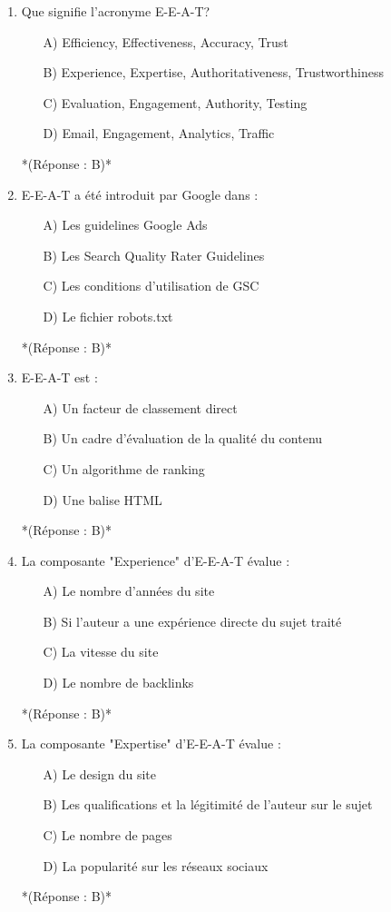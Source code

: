 \documentclass[12pt,a4paper,twoside]{report}
\begin{document}
\begin{enumerate}
\item Que signifie l'acronyme E-E-A-T?
\begin{itemize}
\item[A)] Efficiency, Effectiveness, Accuracy, Trust
\item[B)] Experience, Expertise, Authoritativeness, Trustworthiness
\item[C)] Evaluation, Engagement, Authority, Testing
\item[D)] Email, Engagement, Analytics, Traffic
\end{itemize}
*(Réponse : B)*

\item E-E-A-T a été introduit par Google dans :
\begin{itemize}
\item[A)] Les guidelines Google Ads
\item[B)] Les Search Quality Rater Guidelines
\item[C)] Les conditions d'utilisation de GSC
\item[D)] Le fichier robots.txt
\end{itemize}
*(Réponse : B)*

\item E-E-A-T est :
\begin{itemize}
\item[A)] Un facteur de classement direct
\item[B)] Un cadre d'évaluation de la qualité du contenu
\item[C)] Un algorithme de ranking
\item[D)] Une balise HTML
\end{itemize}
*(Réponse : B)*

\item La composante "Experience" d'E-E-A-T évalue :
\begin{itemize}
\item[A)] Le nombre d'années du site
\item[B)] Si l'auteur a une expérience directe du sujet traité
\item[C)] La vitesse du site
\item[D)] Le nombre de backlinks
\end{itemize}
*(Réponse : B)*

\item La composante "Expertise" d'E-E-A-T évalue :
\begin{itemize}
\item[A)] Le design du site
\item[B)] Les qualifications et la légitimité de l'auteur sur le sujet
\item[C)] Le nombre de pages
\item[D)] La popularité sur les réseaux sociaux
\end{itemize}
*(Réponse : B)*


\end{enumerate}
\end{document}

